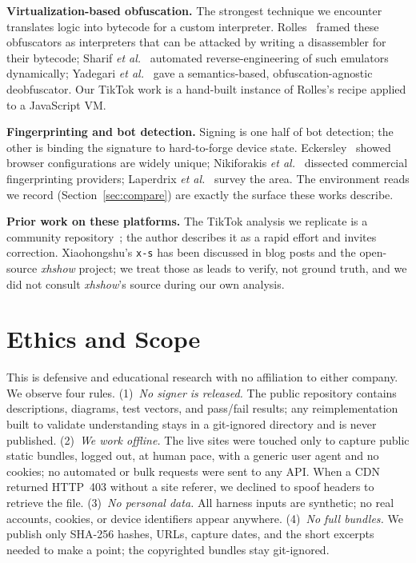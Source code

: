 \documentclass[conference,10pt]{IEEEtran}
\newcommand{\code}[1]{\texttt{\small #1}}
\begin{document}
\textbf{Virtualization-based obfuscation.} The strongest technique we encounter translates logic into bytecode for a custom interpreter. Rolles~\cite{rolles2009unpacking} framed these obfuscators as interpreters that can be attacked by writing a disassembler for their bytecode; Sharif \emph{et al.}~\cite{sharif2009emulators} automated reverse-engineering of such emulators dynamically; Yadegari \emph{et al.}~\cite{yadegari2015generic} gave a semantics-based, obfuscation-agnostic deobfuscator. Our TikTok work is a hand-built instance of Rolles's recipe applied to a JavaScript VM.

\textbf{Fingerprinting and bot detection.} Signing is one half of bot detection; the other is binding the signature to hard-to-forge device state. Eckersley~\cite{eckersley2010unique} showed browser configurations are widely unique; Nikiforakis \emph{et al.}~\cite{nikiforakis2013cookieless} dissected commercial fingerprinting providers; Laperdrix \emph{et al.}~\cite{laperdrix2020fingerprinting} survey the area. The environment reads we record (Section~\ref{sec:compare}) are exactly the surface these works describe.

\textbf{Prior work on these platforms.} The TikTok analysis we replicate is a community repository~\cite{tiktokref}; the author describes it as a rapid effort and invites correction. Xiaohongshu's \code{x-s} has been discussed in blog posts and the open-source \emph{xhshow} project; we treat those as leads to verify, not ground truth, and we did not consult \emph{xhshow}'s source during our own analysis.

\section{Ethics and Scope}
\label{sec:ethics}
This is defensive and educational research with no affiliation to either company. We observe four rules. (1)~\emph{No signer is released.} The public repository contains descriptions, diagrams, test vectors, and pass/fail results; any reimplementation built to validate understanding stays in a git-ignored directory and is never published. (2)~\emph{We work offline.} The live sites were touched only to capture public static bundles, logged out, at human pace, with a generic user agent and no cookies; no automated or bulk requests were sent to any API. When a CDN returned HTTP~403 without a site referer, we declined to spoof headers to retrieve the file. (3)~\emph{No personal data.} All harness inputs are synthetic; no real accounts, cookies, or device identifiers appear anywhere. (4)~\emph{No full bundles.} We publish only SHA-256 hashes, URLs, capture dates, and the short excerpts needed to make a point; the copyrighted bundles stay git-ignored.
\end{document}
